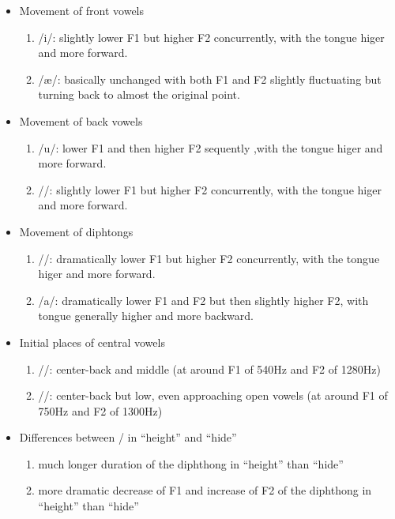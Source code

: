 \documentclass{../labbook}
\begin{document}
\begin{solution}
\begin{itemize}
    \item Movement of front vowels
    \begin{enumerate}
        \item /i/: slightly lower F1 but higher F2 concurrently, with the tongue higer and more forward.
        \item /\ae/: basically unchanged with both F1 and F2 slightly fluctuating but turning back to almost the original point.
    \end{enumerate}
    \item Movement of back vowels
    \begin{enumerate}
        \item /u/: lower F1 and then higher F2 sequently ,with the tongue higer and more forward.
        \item /\textopeno/: slightly lower F1 but higher F2 concurrently, with the tongue higer and more forward.
    \end{enumerate}
    \item Movement of diphtongs 
    \begin{enumerate}
        \item /\textscripta \textsci /: dramatically lower F1 but higher F2 concurrently, with the tongue higer and more forward.
        \item /a\textupsilon /: dramatically lower F1 and F2 but then slightly higher F2, with tongue generally higher and more backward.  
    \end{enumerate}
    \item Initial places of central vowels 
    \begin{enumerate}
        \item /\textrhookschwa /: center-back and middle (at around F1 of 540Hz and F2 of 1280Hz)
        \item /\textschwa /: center-back but low, even approaching open vowels (at around F1 of 750Hz and F2 of 1300Hz)
    \end{enumerate}
    \item Differences between \textscripta \textsci / in ``height'' and ``hide''
    \begin{enumerate}
        \item much longer duration of the diphthong in ``height'' than ``hide''
        \item more dramatic decrease of F1 and increase of F2 of the diphthong in ``height'' than ``hide''
    \end{enumerate}
\end{itemize}
\end{solution}
\end{document}

